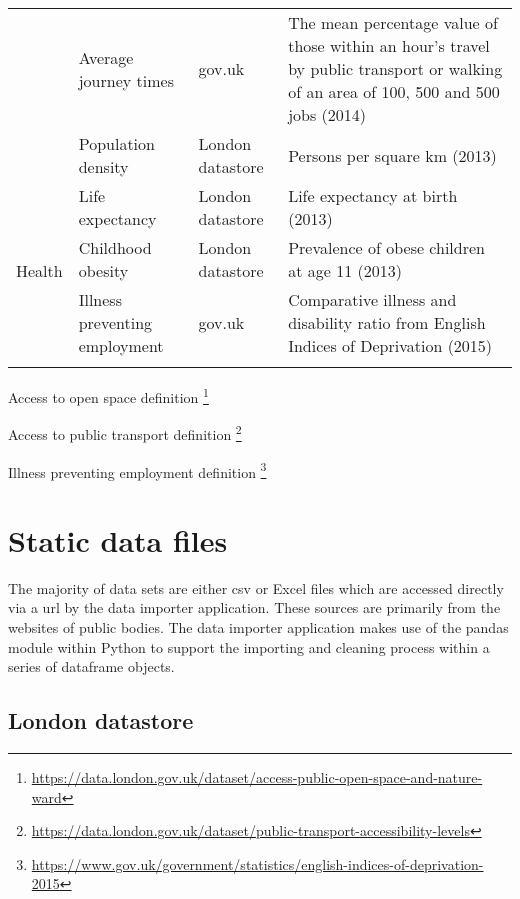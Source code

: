 \begin{table}[H]
{\begin{tabular}{llll}
                         & Average journey times   & gov.uk  & The mean percentage value of those within an hour's travel by public transport or walking of an area of 100, 500 and 500 jobs (2014)\\
                         & Population density & London datastore & Persons per square km (2013)\\
\hline
\multirow{3}{*}{Health}  & Life expectancy & London datastore & Life expectancy at birth (2013) \\
                         & Childhood obesity   & London datastore   & Prevalence of obese children at age 11 (2013)  \\
                         & Illness preventing employment & gov.uk  &  Comparative illness and disability ratio from English Indices of Deprivation (2015)\\
\bottomrule\\              
\end{tabular}
}
\end{table}

Access to open space definition \footnote{\url{https://data.london.gov.uk/dataset/access-public-open-space-and-nature-ward}}

Access to public transport definition \footnote{\url{https://data.london.gov.uk/dataset/public-transport-accessibility-levels}}

Illness preventing employment definition  \footnote{\url{https://www.gov.uk/government/statistics/english-indices-of-deprivation-2015}}


\section{Static data files}

The majority of data sets are either csv or Excel files which are accessed directly via a url by the data importer application. These sources are primarily from the websites of public bodies. The data importer application makes use of the pandas module within Python to support the importing and cleaning process within a series of dataframe objects.

\subsection{London datastore}

